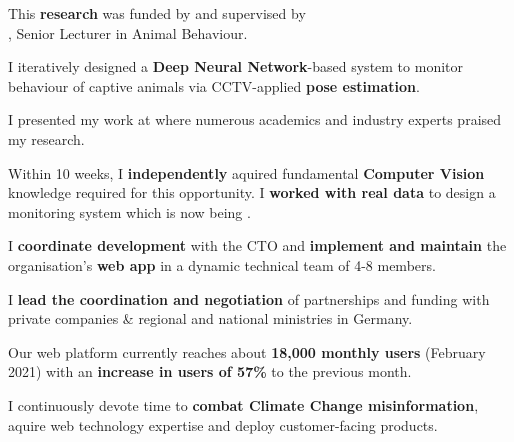 \documentclass[]{jonas-cv}
\begin{document}
\begin{minipage}[t]{0.63\textwidth} 

\tinysectionsep

\sectionsep

\begin{tightemize}
    \item This \textbf{research} was funded by  and supervised by\\
    , Senior Lecturer in Animal Behaviour.
    \item I iteratively designed a \textbf{Deep Neural Network}-based system to 
    monitor behaviour of captive animals via CCTV-applied \textbf{pose estimation}.
    \item I presented my work at  where numerous academics and industry experts praised my research.
    \item[\angleDoubleRightSymbol] Within 10 weeks, I \textbf{independently} aquired fundamental \textbf{Computer Vision}
    knowledge required for this opportunity. I \textbf{worked with real data} to design a 
    monitoring system which is now being
    .
\end{tightemize}
\sectionsep


\begin{tightemize}
    \item I \textbf{coordinate development} with the CTO and \textbf{implement and maintain} the organisation's \textbf{web app} in a dynamic technical team of 4-8 members.
    \item I \textbf{lead the coordination and negotiation} of partnerships and funding with private companies \& regional and national ministries in Germany.
    \item Our web platform currently reaches about \textbf{18,000 monthly users} (February 2021) with an \textbf{increase in users of 57\%} to the previous month.
    \item[\angleDoubleRightSymbol] I continuously devote time to \textbf{combat Climate Change misinformation}, aquire web technology expertise and deploy customer-facing products.
\end{tightemize}
\sectionsep



\end{minipage}
\end{document}
